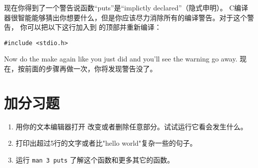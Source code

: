 现在你得到了一个警告说函数“puts”是“implictly declared”（隐式申明）。
C编译器很智能能够猜出你想要什么，但是你应该尽力消除所有的编译警告。对于这个警告，
你可以把以下这行加入到  的顶部并重新编译：

\begin{lstlisting}
#include <stdio.h>
\end{lstlisting}

Now do the make again like you just did and you'll see the warning go away.
现在，按前面的步骤再做一次，你将发现警告没了。

\section{加分习题}

\begin{enumerate}
\item 用你的文本编辑器打开  改变或者删除任意部分。试试运行它看会发生什么。
\item 打印出超过5行的文字或者比"hello world"复杂一些的句子。
\item 运行 \verb|man 3 puts| 了解这个函数和更多其它的函数。
\end{enumerate}


